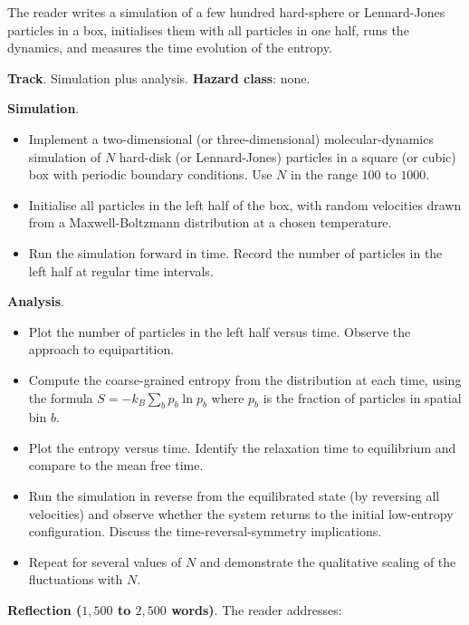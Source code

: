 \begin{project}
The reader writes a simulation of a few hundred hard-sphere or
Lennard-Jones particles in a box, initialises them with all particles
in one half, runs the dynamics, and measures the time evolution of
the entropy.

\textbf{Track}. Simulation plus analysis.
\textbf{Hazard class}: none.

\textbf{Simulation}.

\begin{itemize}[leftmargin=*]
  \item Implement a two-dimensional (or three-dimensional)
    molecular-dynamics simulation of $N$ hard-disk (or Lennard-Jones)
    particles in a square (or cubic) box with periodic boundary
    conditions. Use $N$ in the range $100$ to $1000$.
  \item Initialise all particles in the left half of the box, with
    random velocities drawn from a Maxwell-Boltzmann distribution at
    a chosen temperature.
  \item Run the simulation forward in time. Record the number of
    particles in the left half at regular time intervals.
\end{itemize}

\textbf{Analysis}.

\begin{itemize}[leftmargin=*]
  \item Plot the number of particles in the left half versus time.
    Observe the approach to equipartition.
  \item Compute the coarse-grained entropy from the distribution at
    each time, using the formula $S = -k_B \sum_b p_b \ln p_b$ where
    $p_b$ is the fraction of particles in spatial bin $b$.
  \item Plot the entropy versus time. Identify the relaxation time
    to equilibrium and compare to the mean free time.
  \item Run the simulation in reverse from the equilibrated state
    (by reversing all velocities) and observe whether the system
    returns to the initial low-entropy configuration. Discuss the
    time-reversal-symmetry implications.
  \item Repeat for several values of $N$ and demonstrate the
    qualitative scaling of the fluctuations with $N$.
\end{itemize}

\textbf{Reflection ($1{,}500$ to $2{,}500$ words)}. The reader
addresses:


\end{project}
